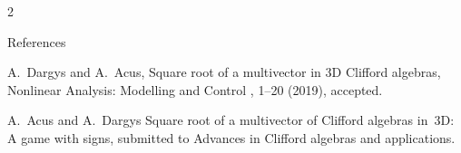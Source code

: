 \documentclass[a4paper,10pt,lithuanian]{article}
\begin{document}
\begin{multicols*}{2}
\begin{thebibliography}{References}

A.~Dargys and A.~Acus,
\newblock Square root of a multivector in 3D {C}lifford algebras,
\newblock Nonlinear Analysis: Modelling and Control , 1--20 (2019),
\newblock accepted.

A.~Acus and A.~Dargys
\newblock Square root of a multivector of Clifford algebras in~3D: A game with signs,
\newblock submitted to Advances in Clifford algebras and applications.

\end{thebibliography}

\end{multicols*}
\end{document}
